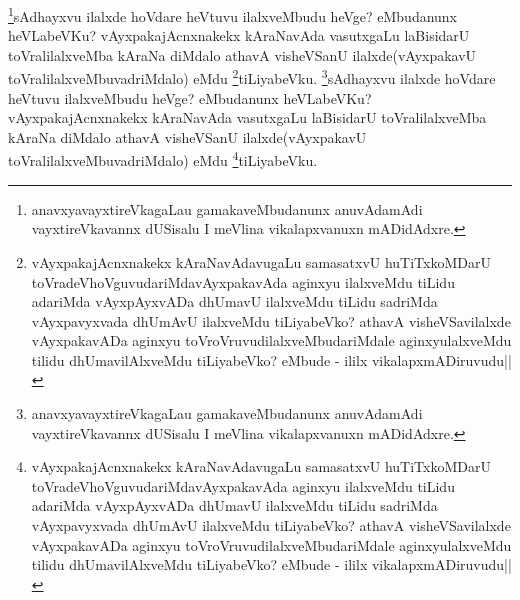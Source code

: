 \begin{artha}
\footnote{anavxyavayxtireVkagaLau gamakaveMbudanunx anuvAdamAdi vayxtireVkavannx dUSisalu I meVlina vikalapxvanuxn mADidAdxre.}sAdhayxvu ilalxde hoVdare heVtuvu ilalxveMbudu heVge? eMbudanunx heVLabeVKu? vAyxpakajAcnxnakekx kAraNavAda vasutxgaLu laBisidarU toVralilalxveMba kAraNa diMdalo athavA visheVSanU ilalxde(vAyxpakavU toVralilalxveMbuvadriMdalo) eMdu \footnote{vAyxpakajAcnxnakekx kAraNavAdavugaLu  samasatxvU huTiTxkoMDarU toVradeVhoVguvudariMdavAyxpakavAda aginxyu ilalxveMdu tiLidu adariMda vAyxpAyxvADa dhUmavU ilalxveMdu tiLidu sadriMda vAyxpavyxvada dhUmAvU ilalxveMdu tiLiyabeVko? athavA visheVSavilalxde vAyxpakavADa aginxyu toVroVruvudilalxveMbudariMdale aginxyulalxveMdu tilidu dhUmavilAlxveMdu tiLiyabeVko? eMbude - ililx vikalapxmADiruvudu||}tiLiyabeVku.
\footnote{anavxyavayxtireVkagaLau gamakaveMbudanunx anuvAdamAdi vayxtireVkavannx dUSisalu I meVlina vikalapxvanuxn mADidAdxre.}sAdhayxvu ilalxde hoVdare heVtuvu ilalxveMbudu heVge? eMbudanunx heVLabeVKu? vAyxpakajAcnxnakekx kAraNavAda vasutxgaLu laBisidarU toVralilalxveMba kAraNa diMdalo athavA visheVSanU ilalxde(vAyxpakavU toVralilalxveMbuvadriMdalo) eMdu \footnote{vAyxpakajAcnxnakekx kAraNavAdavugaLu  samasatxvU huTiTxkoMDarU toVradeVhoVguvudariMdavAyxpakavAda aginxyu ilalxveMdu tiLidu adariMda vAyxpAyxvADa dhUmavU ilalxveMdu tiLidu sadriMda vAyxpavyxvada dhUmAvU ilalxveMdu tiLiyabeVko? athavA visheVSavilalxde vAyxpakavADa aginxyu toVroVruvudilalxveMbudariMdale aginxyulalxveMdu tilidu dhUmavilAlxveMdu tiLiyabeVko? eMbude - ililx vikalapxmADiruvudu||}tiLiyabeVku.
\end{artha}

